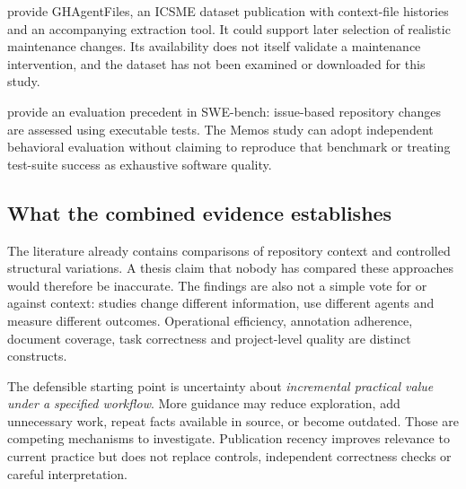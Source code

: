 \citet{cardoen2026} provide GHAgentFiles, an ICSME dataset publication with
context-file histories and an accompanying extraction tool. It could support
later selection of realistic maintenance changes. Its availability does not
itself validate a maintenance intervention, and the dataset has not been
examined or downloaded for this study.

\citet{jimenez2024} provide an evaluation precedent in SWE-bench: issue-based
repository changes are assessed using executable tests. The Memos study can
adopt independent behavioral evaluation without claiming to reproduce that
benchmark or treating test-suite success as exhaustive software quality.

\subsection{What the combined evidence establishes}
The literature already contains comparisons of repository context and controlled
structural variations. A thesis claim that nobody has compared these approaches
would therefore be inaccurate. The findings are also not a simple vote for or
against context: studies change different information, use different agents and
measure different outcomes. Operational efficiency, annotation adherence,
document coverage, task correctness and project-level quality are distinct
constructs.

The defensible starting point is uncertainty about \emph{incremental practical
value under a specified workflow}. More guidance may reduce exploration, add
unnecessary work, repeat facts available in source, or become outdated. Those
are competing mechanisms to investigate. Publication recency improves relevance
to current practice but does not replace controls, independent correctness
checks or careful interpretation.

